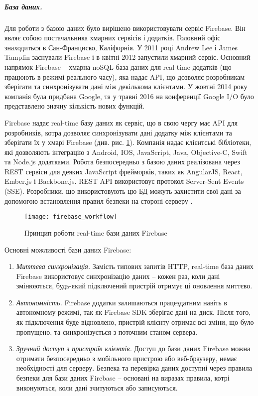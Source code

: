 \documentclass[../main.tex]{subfiles}
\begin{document}

\subparagraph{База даних.}
Для роботи з базою даних було вирішено використовувати сервіс Firebase. Він являє собою постачальника хмарних сервісів і додатків. Головний офіс знаходиться в Сан-Франциско, Каліфорнія. У 2011 році Andrew Lee і James Tamplin заснували Firebase і в квітні 2012 запустили хмарний сервіс. Основний напрямок Firebase -- хмарна noSQL база даних для real-time додатків (що працюють в режимі реального часу), яка надає API, що дозволяє розробникам зберігати та синхронізувати дані між декількома клієнтами. У жовтні 2014 року компанія була придбана Google, та у травні 2016 на конференції Google I/O було представлено значну кількість нових функцій.

Firebase надає real-time базу даних як сервіс, що в свою чергу має API для розробників, котра дозволяє синхронізувати дані додатку між клієнтами та зберігати їх у хмарі Firebase (див. рис. \ref{figure:firebase_workflow}). Компанія надає клієнтські бібліотеки, які дозволяють інтеграцію з Android, IOS, JavaScript, Java, Objective-C, Swift та Node.js додатками. Робота безпосередньо з базою даних реалізована через REST сервіси для деяких JavaScript фрейморків, таких як AngularJS, React, Ember.js і Backbone.js. REST API використовує протокол Server-Sent Events (SSE). Розробники, що використовують цю БД можуть захистити свої дані за допомогою встановлення правил безпеки на стороні серверу \cite{firebase_secure}.

\begin{figure}[H]
	\centering
	\texttt{[image: firebase\_workflow]}
	\caption{Принцип роботи real-time бази даних Firebase}
	\label{figure:firebase_workflow}
\end{figure}

Основні можливості бази даних Firebase:
\begin{enumerate}
	\item \textit{Миттєва синхронізація.} Замість типових запитів HTTP, real-time база даних Firebase використовує синхронізацію даних -- кожен раз, коли дані змінюються, будь-який підключений пристрій отримує ці оновлення миттєво.
	\item \textit{Автономність.} Firebase додатки залишаються працездатним навіть в автономному режимі, так як Firebase SDK зберігає дані на диск. Після того, як підключення буде відновлено, пристрій клієнту отримає всі зміни, що було пропущено, та синхронізується з поточним станом сервера.
	\item \textit{Зручний доступ з пристроїв клієнтів.} Доступ до бази даних Firebase можна отримати безпосередньо з мобільного пристрою або веб-браузеру, немає необхідності для серверу. Безпека та перевірка даних доступні через правила безпеки для бази даних Firebase -- основані на виразах правила, котрі виконуються, коли дані зчитуються або записуються.
\end{enumerate}
\end{document}
